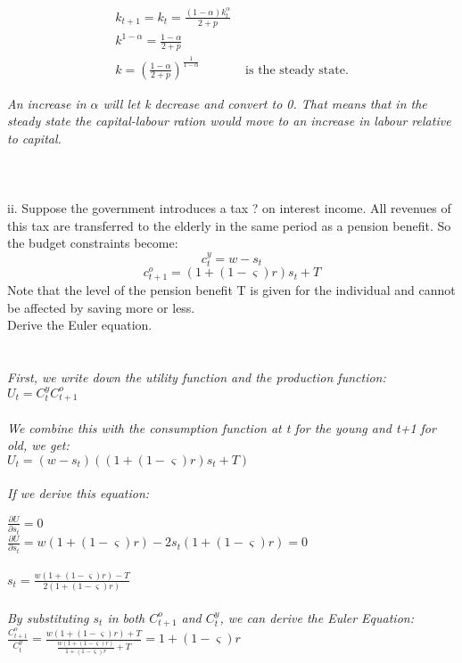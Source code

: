 \documentclass{article}
\begin{document}
\begin{eqnarray}
k_{t+1} = k_t = \frac {(1-\alpha)k_t^\alpha}{2+p} \nonumber \\
k^{1-\alpha} = \frac{1-\alpha}{2+p} \nonumber \\
k= (\frac{1-\alpha}{2+p})^\frac{1}{1-\alpha} \nonumber & \mbox{ is the steady state.}
\end{eqnarray} 

\textit{An increase in $\alpha$ will let k decrease and convert to 0. That means that in the steady state the capital-labour ration would move to an increase in labour relative to capital.}
 \\
 \\
 \\
 \\
ii. Suppose the government introduces a tax ? on interest income. All revenues of this tax are transferred to the elderly in the same period as a pension benefit. So the budget constraints become:
\begin{equation}
c_t^y=w-s_t
\end{equation}
\begin{equation}
c_{t+1}^o = (1+(1-\varsigma)r)s_t+T
\end{equation}
Note that the level of the pension benefit T is given for the individual and cannot be affected by saving more or less.\\
Derive the Euler equation. \\
\\
\\
\textit{First, we write down the utility function and the production function:}\\
$U_t = C_t^yC_{t+1}^o$\\
\\ 
\textit{We combine this with the consumption function at t for the young and t+1 for old, we get:}\\
$U_t = (w-s_t)((1+(1-\varsigma)r)s_t+T)$\\
\\
\textit{If we derive this equation:}

$\frac{\partial U}{\partial s_t} = 0 $\\
$\frac{\partial U}{\partial s_t} = w(1+(1-\varsigma)r) - 2s_t(1+(1-\varsigma)r) = 0$\\
\\
$s_t = \frac{w(1+(1-\varsigma)r)-T}{2(1+(1-\varsigma)r)} $\\
\\
\textit{By substituting $s_t$ in both $C_{t+1}^o$ and $C_t^y$, we can derive the Euler Equation:}\\
$\frac{C_{t+1}^o}{C_t^y} = \frac{w(1+(1-\varsigma)r)+T}{\frac{w(1+(1-\varsigma)r)}{1+(1-\varsigma)r}+T} =1+(1-\varsigma)r$
\end{document}
